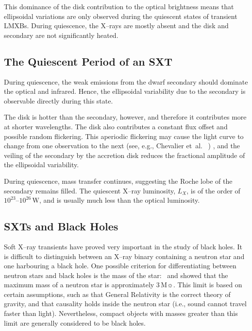 \vspace{\myparskip}

This dominance of the disk contribution to the optical brightness means
that ellipsoidal variations are only observed during the quiescent
states of transient LMXBs. During
quiescence, the X--rays are mostly absent and the disk and secondary are not
significantly heated. %


\subsection{The Quiescent Period of an SXT}
\label{cha:Introduction:sec:X--rayBinaries:subsec:Quiescence}

During quiescence, the weak emissions from the dwarf secondary should dominate the optical and
infrared. Hence, the ellipsoidal variability due to the secondary is
observable directly during this state. %

\vspace{\myparskip}

The disk is hotter than the secondary, however, and therefore it contributes more at shorter wavelengths. 
The disk also contributes a constant flux offset and
possible random flickering. This aperiodic flickering may cause the light curve to change
from one observation to the next (see, e.g., Chevalier et~al.\ %
)%
, and the veiling of the secondary by the accretion disk reduces the
fractional amplitude of the ellipsoidal variability. %

\vspace{\myparskip}

During quiescence, mass transfer continues, suggesting the Roche lobe
of the secondary remains filled. The quiescent X--ray luminosity,
$L_X$, is of the order of $10^{23}$--$10^{26}\,\mathrm{W}$, and is
usually much less than the optical luminosity. 


\subsection{SXTs and Black Holes}
\label{cha:Introduction:sec:X--rayBinaries:subsec:BHCSXTs}

Soft X--ray transients have proved very important in the study of
black holes. It is difficult to distinguish between an X--ray binary containing a neutron star and one harbouring a black hole. One possible criterion for differentiating between neutron stars and
black holes is the mass of the star: %
\ and %
showed that the maximum mass of a neutron star is approximately
$3\,\mathrm{M}\sun$. %
This limit is based on certain assumptions, such as that General Relativity
is the correct theory of gravity, and that causality holds inside the
neutron star (i.e., sound cannot travel faster than light). Nevertheless, compact objects with masses greater than this limit are generally considered to be black holes. 

